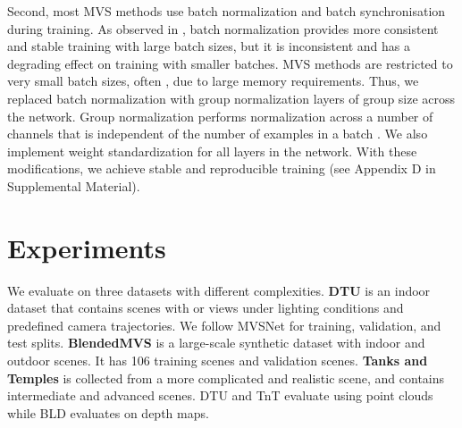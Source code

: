 \documentclass[10pt,twocolumn,letterpaper]{article}
\begin{document}
Second, most MVS methods \cite{gu2019casmvsnet, ding2022transmvsnet,
  peng2022rethinkingMVS, wei2021aa, Zhang2020visibility,
  weilharter2021highresMVS} use batch normalization 
\cite{ioffe2015batchnorm} and batch synchronisation during training.
As observed in \cite{ioffe2015batchnorm}, batch normalization provides more consistent
and stable training with large batch sizes, but it is inconsistent and
has a degrading effect on training with smaller batches. MVS
methods are restricted to very small batch sizes, often , due to
large memory requirements. Thus, we replaced batch normalization with 
group normalization  layers
\cite{he2018groupnorm} of group size  across the network. Group normalization performs normalization across a 
number of channels that is independent of the
number of examples in a batch \cite{he2018groupnorm}. We also implement weight standardization
\cite{qiao2019weightstandardization} for all layers in the
network. With these modifications, we achieve stable and reproducible
training (see Appendix D in Supplemental Material).



\vspace{-5pt}
\section{Experiments}\label{sec:experiments}

We evaluate on three datasets with different
complexities. \textbf{DTU} \cite{jensen2014dtu} is an indoor dataset
that contains  scenes with  or  views under  lighting
conditions and predefined camera trajectories. We follow MVSNet
\cite{yao2018mvsnet} for training, validation, and test
splits. \textbf{BlendedMVS}\cite{yao2019blended} is a
large-scale synthetic dataset with  indoor and outdoor scenes. It
has 106 training scenes and  validation scenes. \textbf{Tanks and
  Temples} \cite{Knapitsch2017tnt} is collected from a more
complicated and realistic scene, and contains  intermediate and 
advanced scenes. DTU and TnT evaluate using point clouds while BLD
evaluates on depth maps.
\end{document}
